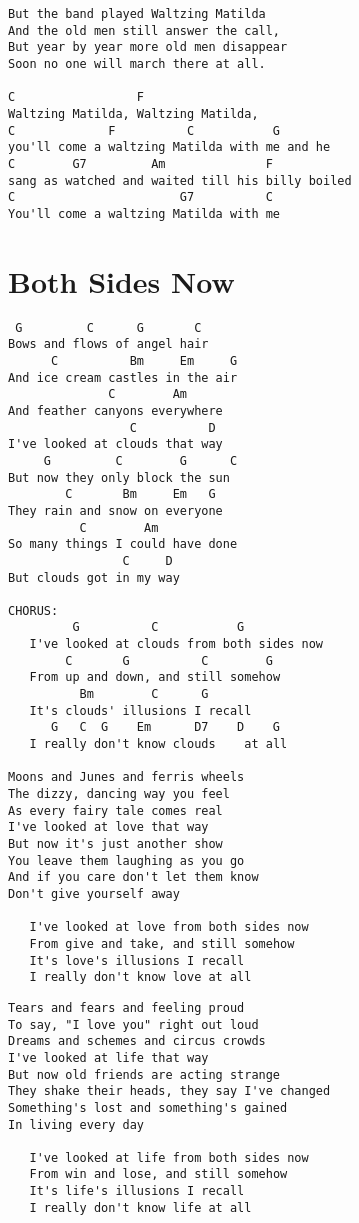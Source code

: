 \documentclass[leqno]{memoir}
\begin{document}
\begin{verbatim}
But the band played Waltzing Matilda
And the old men still answer the call,
But year by year more old men disappear
Soon no one will march there at all.

C                 F         
Waltzing Matilda, Waltzing Matilda,
C             F          C           G
you'll come a waltzing Matilda with me and he
C        G7         Am              F
sang as watched and waited till his billy boiled
C                       G7          C
You'll come a waltzing Matilda with me

\end{verbatim}
\newpage\chapter{Both Sides Now}
\begin{verbatim}
 G         C      G       C
Bows and flows of angel hair
      C          Bm     Em     G
And ice cream castles in the air
              C        Am
And feather canyons everywhere
                 C          D
I've looked at clouds that way
     G         C        G      C
But now they only block the sun
        C       Bm     Em   G
They rain and snow on everyone
          C        Am
So many things I could have done
                C     D
But clouds got in my way

CHORUS:
         G          C           G
   I've looked at clouds from both sides now
        C       G          C        G
   From up and down, and still somehow
          Bm        C      G
   It's clouds' illusions I recall
      G   C  G    Em      D7    D    G
   I really don't know clouds    at all

Moons and Junes and ferris wheels
The dizzy, dancing way you feel
As every fairy tale comes real
I've looked at love that way
But now it's just another show
You leave them laughing as you go
And if you care don't let them know
Don't give yourself away

   I've looked at love from both sides now
   From give and take, and still somehow
   It's love's illusions I recall
   I really don't know love at all
\end{verbatim}
\newpage
\begin{verbatim}
Tears and fears and feeling proud
To say, "I love you" right out loud
Dreams and schemes and circus crowds
I've looked at life that way
But now old friends are acting strange
They shake their heads, they say I've changed
Something's lost and something's gained
In living every day

   I've looked at life from both sides now
   From win and lose, and still somehow
   It's life's illusions I recall
   I really don't know life at all

\end{verbatim}
\newpage
\end{document}
